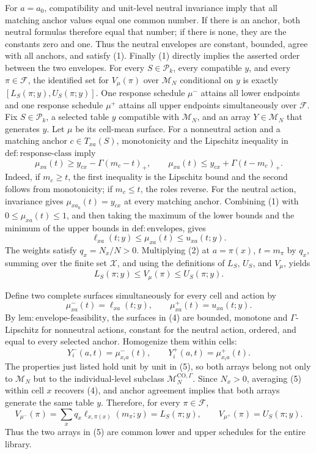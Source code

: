 For \(a=a_0\), compatibility and unit-level neutral invariance imply that all matching anchor values equal one common number.  If there is an anchor, both neutral formulas therefore equal that number; if there is none, they are the constants zero and one.  Thus the neutral envelopes are constant, bounded, agree with all anchors, and satisfy (1).  Finally (1) directly implies the asserted order between the two envelopes.
For every \(S\in\mathcal P_k\), every compatible \(y\), and every \(\pi\in\mathcal F\), the identified set for \(V_{\mu}(\pi)\) over \(\mathcal M_N\) conditional on \(y\) is exactly \([L_S(\pi;y),U_S(\pi;y)]\). One response schedule \(\mu^{-}\) attains all lower endpoints and one response schedule \(\mu^{+}\) attains all upper endpoints simultaneously over \(\mathcal F\).
Fix \(S\in\mathcal P_k\), a selected table \(y\) compatible with \(\mathcal M_N\), and an array \(Y\in\mathcal M_N\) that generates \(y\).  Let \(\mu\) be its cell-mean surface.  For a nonneutral action and a matching anchor \(c\in T_{xa}(S)\), monotonicity and the Lipschitz inequality in \(\mathrm{def{:}response\text{-}class}\) imply
\[
\mu_{xa}(t)
\geq y_{cx}-\Gamma(m_c-t)_+,
\qquad
\mu_{xa}(t)
\leq y_{cx}+\Gamma(t-m_c)_+.
\tag{1}
\]
Indeed, if \(m_c\geq t\), the first inequality is the Lipschitz bound and the second follows from monotonicity; if \(m_c\leq t\), the roles reverse.  For the neutral action, invariance gives \(\mu_{x a_0}(t)=y_{cx}\) at every matching anchor.  Combining (1) with \(0\leq\mu_{xa}(t)\leq1\), and then taking the maximum of the lower bounds and the minimum of the upper bounds in \(\mathrm{def{:}envelopes}\), gives
\[
\ell_{xa}(t;y)\leq\mu_{xa}(t)\leq u_{xa}(t;y).
\tag{2}
\]
The weights satisfy \(q_x=N_x/N>0\).  Multiplying (2) at \(a=\pi(x)\), \(t=m_\pi\) by \(q_x\), summing over the finite set \(\mathcal X\), and using the definitions of \(L_S\), \(U_S\), and \(V_\mu\), yields
\[
L_S(\pi;y)
\leq V_\mu(\pi)
\leq U_S(\pi;y).
\tag{3}
\]

Define two complete surfaces simultaneously for every cell and action by
\[
\mu^-_{xa}(t)=\ell_{xa}(t;y),
\qquad
\mu^+_{xa}(t)=u_{xa}(t;y).
\tag{4}
\]
By \(\mathrm{lem{:}envelope\text{-}feasibility}\), the surfaces in (4) are bounded, monotone and \(\Gamma\)-Lipschitz for nonneutral actions, constant for the neutral action, ordered, and equal to every selected anchor.  Homogenize them within cells:
\[
Y_i^-(a,t)=\mu^-_{x_i a}(t),
\qquad
Y_i^+(a,t)=\mu^+_{x_i a}(t).
\tag{5}
\]
The properties just listed hold unit by unit in (5), so both arrays belong not only to \(\mathcal M_N\) but to the individual-level subclass \(\mathcal M_N^{\mathrm{CO},\Gamma}\).  Since \(N_x>0\), averaging (5) within cell \(x\) recovers (4), and anchor agreement implies that both arrays generate the same table \(y\).  Therefore, for every \(\pi\in\mathcal F\),
\[
V_{\mu^-}(\pi)
=\sum_xq_x\ell_{x,\pi(x)}(m_\pi;y)
=L_S(\pi;y),
\qquad
V_{\mu^+}(\pi)
=U_S(\pi;y).
\tag{6}
\]
Thus the two arrays in (5) are common lower and upper schedules for the entire library.

